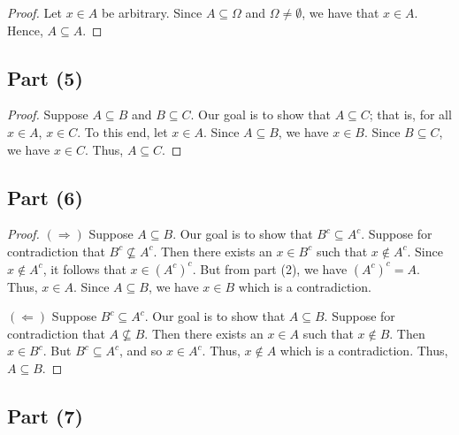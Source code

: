\documentclass[a4paper]{article}
\begin{document}
\begin{proof}
Let \( x \in A  \) be arbitrary. Since \( A \subseteq \Omega  \) and \( \Omega \neq \emptyset \), we have that \( x \in A  \). Hence, \( A \subseteq A  \).
\end{proof}

\subsection*{Part (5)}

\begin{proof}
    Suppose \( A \subseteq  B  \) and \( B \subseteq  C  \). Our goal is to show that \( A \subseteq  C  \); that is, for all \( x \in A  \), \( x \in C  \). To this end, let \( x \in A  \). Since \( A \subseteq B  \), we have \( x \in B \). Since \( B \subseteq C  \), we have \( x \in C  \). Thus, \( A \subseteq  C  \).
\end{proof}

\subsection*{Part (6)}

\begin{proof}
\( (\Longrightarrow) \) Suppose \( A \subseteq  B  \). Our goal is to show that \( B^{c} \subseteq A^{c} \). Suppose for contradiction that \( B^{c} \not\subseteq A^{c} \). Then there exists an \( x \in B^{c} \) such that \( x \notin A^{c}  \). Since \( x \notin A^{c}  \), it follows that \( x \in (A^{c})^{c} \). But from part (2), we have \( (A^{c})^{c} =A  \). Thus, \( x \in A  \). Since \( A \subseteq B \), we have \( x \in B \) which is a contradiction.

\( (\Longleftarrow) \) Suppose \( B^{c} \subseteq  A^{c} \). Our goal is to show that \( A \subseteq B \). Suppose for contradiction that \( A \not\subseteq B \). Then there exists an \( x \in A  \) such that \( x \notin B \). Then \( x \in B^{c} \). But \( B^{c} \subseteq A^{c}  \), and so \( x \in A^{c} \). Thus, \( x \notin A   \) which is a contradiction. Thus, \( A \subseteq B \).  
\end{proof}

\subsection*{Part (7)}
\end{document}
